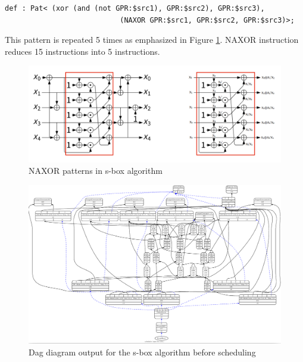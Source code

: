 \begin{lstlisting}
def : Pat< (xor (and (not GPR:$src1), GPR:$src2), GPR:$src3),
                           (NAXOR GPR:$src1, GPR:$src2, GPR:$src3)>;
\end{lstlisting}

This pattern is repeated 5 times as emphasized in Figure \ref{fig:sbox_naxor_pattern}. NAXOR instruction reduces 15 instructions into 5 instructions.

\begin{figure}
    \centering
    \includegraphics[scale=0.3]{adding_new_instr/sbox_naxor_pattern.png}
    \caption{NAXOR patterns in s-box algorithm}
    \label{fig:sbox_naxor_pattern}
\end{figure}

\begin{figure}
    \centering
    \includegraphics[scale=0.2]{adding_new_instr/naxor_sched.png}
    \caption{Dag diagram output for the s-box algorithm before scheduling}
    \label{fig:naxor_sched_diagram}
\end{figure}

